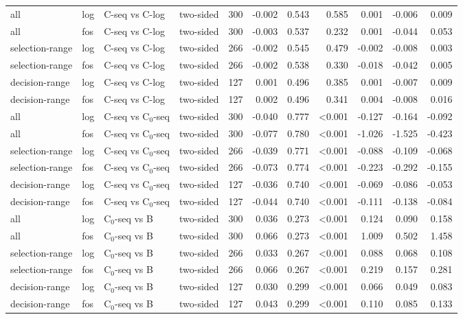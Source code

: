 \begin{longtable}{llllrrrrrrr}
all & log & C-seq vs C-log & two-sided & 300 & -0.002 & 0.543 & 0.585 & 0.001 & -0.006 & 0.009 \\
all & fos & C-seq vs C-log & two-sided & 300 & -0.003 & 0.537 & 0.232 & 0.001 & -0.044 & 0.053 \\
selection-range & log & C-seq vs C-log & two-sided & 266 & -0.002 & 0.545 & 0.479 & -0.002 & -0.008 & 0.003 \\
selection-range & fos & C-seq vs C-log & two-sided & 266 & -0.002 & 0.538 & 0.330 & -0.018 & -0.042 & 0.005 \\
decision-range & log & C-seq vs C-log & two-sided & 127 & 0.001 & 0.496 & 0.385 & 0.001 & -0.007 & 0.009 \\
decision-range & fos & C-seq vs C-log & two-sided & 127 & 0.002 & 0.496 & 0.341 & 0.004 & -0.008 & 0.016 \\
all & log & C-seq vs C$_0$-seq & two-sided & 300 & -0.040 & 0.777 & <0.001 & -0.127 & -0.164 & -0.092 \\
all & fos & C-seq vs C$_0$-seq & two-sided & 300 & -0.077 & 0.780 & <0.001 & -1.026 & -1.525 & -0.423 \\
selection-range & log & C-seq vs C$_0$-seq & two-sided & 266 & -0.039 & 0.771 & <0.001 & -0.088 & -0.109 & -0.068 \\
selection-range & fos & C-seq vs C$_0$-seq & two-sided & 266 & -0.073 & 0.774 & <0.001 & -0.223 & -0.292 & -0.155 \\
decision-range & log & C-seq vs C$_0$-seq & two-sided & 127 & -0.036 & 0.740 & <0.001 & -0.069 & -0.086 & -0.053 \\
decision-range & fos & C-seq vs C$_0$-seq & two-sided & 127 & -0.044 & 0.740 & <0.001 & -0.111 & -0.138 & -0.084 \\
all & log & C$_0$-seq vs B & two-sided & 300 & 0.036 & 0.273 & <0.001 & 0.124 & 0.090 & 0.158 \\
all & fos & C$_0$-seq vs B & two-sided & 300 & 0.066 & 0.273 & <0.001 & 1.009 & 0.502 & 1.458 \\
selection-range & log & C$_0$-seq vs B & two-sided & 266 & 0.033 & 0.267 & <0.001 & 0.088 & 0.068 & 0.108 \\
selection-range & fos & C$_0$-seq vs B & two-sided & 266 & 0.066 & 0.267 & <0.001 & 0.219 & 0.157 & 0.281 \\
decision-range & log & C$_0$-seq vs B & two-sided & 127 & 0.030 & 0.299 & <0.001 & 0.066 & 0.049 & 0.083 \\
decision-range & fos & C$_0$-seq vs B & two-sided & 127 & 0.043 & 0.299 & <0.001 & 0.110 & 0.085 & 0.133 \\

\end{longtable}

